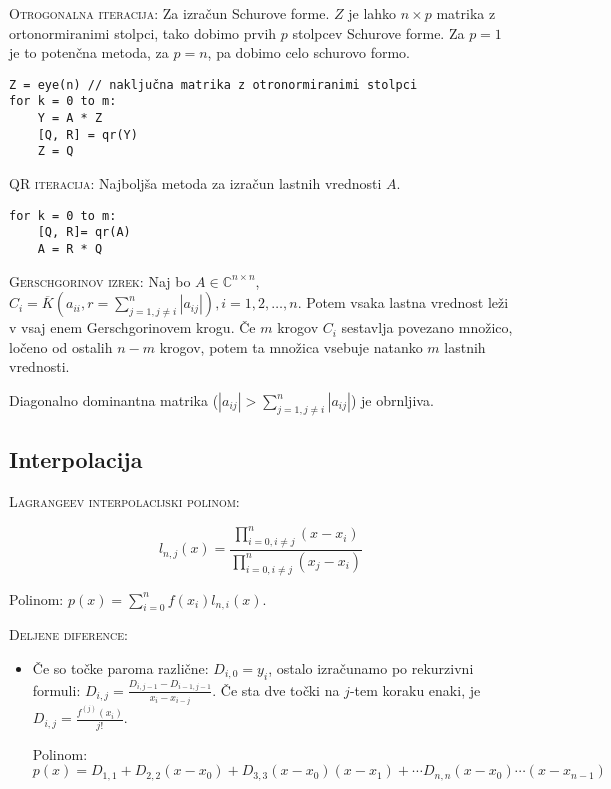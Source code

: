 \documentclass[a4paper,10pt]{article}
\theoremstyle{definition}
\def\C{\mathbb{C}}
\begin{document}
\textsc{Otrogonalna iteracija:} Za izračun Schurove forme. $Z$ je lahko $n\times
p$ matrika z ortonormiranimi stolpci, tako dobimo prvih $p$ stolpcev Schurove
forme. Za $p = 1$ je to potenčna metoda, za $p = n$, pa dobimo celo schurovo
formo.
\scriptsize
\begin{verbatim}
Z = eye(n) // naključna matrika z otronormiranimi stolpci
for k = 0 to m:
    Y = A * Z
    [Q, R] = qr(Y)
    Z = Q
\end{verbatim}
\normalsize

\textsc{QR iteracija:} Najboljša metoda za izračun lastnih vrednosti $A$.
\scriptsize
\begin{verbatim}
for k = 0 to m:
    [Q, R]= qr(A)
    A = R * Q
\end{verbatim}
\normalsize

\textsc{Gerschgorinov izrek:} Naj bo $A \in \C ^{n\times n}$, $C_i =
\overline{K}(a_{ii}, r=\sum_{j=1, j \neq i}^n | a_{ij}|), i=1,2,\ldots ,n$.
Potem vsaka lastna vrednost leži v vsaj enem Gerschgorinovem krogu. Če $m$
krogov $C_i$ sestavlja povezano množico, ločeno od ostalih $n-m$ krogov, potem
ta množica vsebuje natanko $m$ lastnih vrednosti.

Diagonalno dominantna matrika ($|a_{ij}| > \sum_{j=1, j\neq i}^n|a_{ij}|$) je obrnljiva.

\subsection*{Interpolacija}

\textsc{Lagrangeev interpolacijski polinom:}

$$l_{n,j}(x)=\frac{\prod_{i=0,i\neq j}^n(x-x_i)}{\prod_{i=0,i\neq j}^n(x_j-x_i)}$$

Polinom: $p(x) = \sum_{i=0}^nf(x_i)l_{n,i}(x)$.

\textsc{Deljene diference:}

\begin{itemize}

\item Če so točke paroma različne: $D_{i,0} = y_i$, ostalo izračunamo po
rekurzivni formuli: $D_{i,j} = \frac{D_{i,j-1}-D_{i-1,j-1}}{x_i-x_{i-j}}$. Če
sta dve točki na $j$-tem koraku enaki, je $D_{i,j} = \frac{f^{(j)}(x_i)}{j!}$.

Polinom: $p(x) = D_{1,1} + D_{2,2}(x-x_0) + D_{3,3}(x-x_0)(x-x_1) + \cdots D_{n,n}(x-x_0)\cdots (x-x_{n-1})$

\end{itemize}
\end{document}
